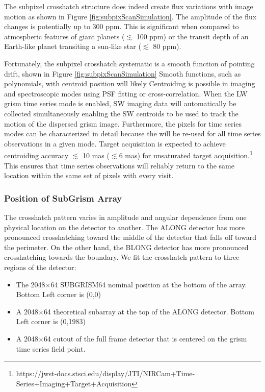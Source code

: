 \documentclass{aastex62}
\begin{document}
The subpixel crosshatch structure does indeed create flux variations with image motion as shown in Figure \ref{fig:subpixScanSimulation}.
The amplitude of the flux changes is potentially up to 300 ppm.
This is significant when compared to atmospheric features of giant planets ($\lesssim$ 100 ppm) or the transit depth of an Earth-like planet transiting a sun-like star ($\lesssim$ 80 ppm).

Fortunately, the subpixel crosshatch systematic is a smooth function of pointing drift, shown in Figure \ref{fig:subpixScanSimulation}
Smooth functions, such as polynomials, with centroid position will likely 
Centroiding is possible in imaging and spectroscopic modes using PSF fitting or cross-correlation.
When the LW grism time series mode is enabled, SW imaging data will automatically be collected simultaneously enabling the SW centroids to be used to track the motion of the dispersed grism image.
Furthermore, the pixels for time series modes can be characterized in detail because the will be re-used for all time series observations in a given mode.
Target acquisition is expected to achieve centroiding accuracy $\lesssim$ 10 mas ($\lesssim 6$ mas) for unsaturated target acquisition.\footnote{https://jwst-docs.stsci.edu/display/JTI/NIRCam+Time-Series+Imaging+Target+Acquisition}
This ensures that time series observations will reliably return to the same location within the same set of pixels with every visit.

\subsubsection{Position of SubGrism Array}

The crosshatch pattern varies in amplitude and angular dependence from one physical location on the detector to another.
The ALONG detector has more pronounced crosshatching toward the middle of the detector that falls off toward the perimeter.
On the other hand, the BLONG detector has more pronounced crosshatching towards the boundary.
We fit the crosshatch pattern to three regions of the detector:
\begin{itemize}
	\item The 2048$\times$64 SUBGRISM64 nominal position at the bottom of the array. Bottom Left corner is (0,0)
	\item A 2048$\times$64 theoretical subarray at the top of the ALONG detector. Bottom Left corner is (0,1983)
	\item A 2048$\times$64 cutout of the full frame detector that is centered on the grism time series field point.
\end{itemize}
\end{document}

